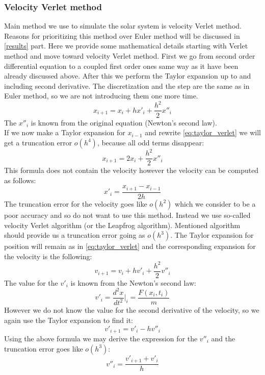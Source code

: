 \documentclass[10pt]{article}
\begin{document}
\subsubsection{Velocity Verlet method}
Main method we use to simulate the solar system is velocity Verlet method. Reasons for prioritizing this method over Euler method will be discussed in \ref{results} part. Here we provide some mathematical details starting with Verlet method and move toward velocity Verlet method. First we go from second order differential equation to a coupled first order ones same way as it have been already discussed above. After this we perform the Taylor expansion up to and including second derivative. The discretization and the step are the same as in Euler method, so we are not introducing them one more time.
\begin{equation}\label{eq:taylor_verlet}
x_{i+1}=x_i+hx'_i+\frac{h^2}{2}x''_i
\end{equation}
The $x''_i$ is known from the original equation (Newton's second law).\\
If we now make a Taylor expansion for $x_{i-1}$ and rewrite \ref{eq:taylor_verlet} we will get a truncation error $o(h^4)$, because all odd terms disappear: 
\[
x_{i+1}=2x_i+\frac{h^2}{2}x''_i
\]
This formula does not contain the velocity however the velocity can be computed as follows:
\[
x'_i=\frac{x_{i+1}-x_{i-1}}{2h}
\]
The truncation error for the velocity goes like $o(h^2)$ which we consider to be a poor accuracy and so do not want to use this method. Instead we use so-called velocity Verlet algorithm (or the Leapfrog algorithm). Mentioned algorithm should provide us a truncation error going as $o(h^3)$. The Taylor expansion for position will remain as in \ref{eq:taylor_verlet} and the corresponding expansion for the velocity is the following:
\begin{equation}
v_{i+1}=v_i+hv'_i+\frac{h^2}{2}v''_i
\end{equation}
The value for the $v'_i$ is known from the Newton's second law:
$$v'_i={\frac{d^2x}{dt^2}\Bigg|_i}=\frac{F(x_i,t_i)}{m}$$
However we do not know the value for the second derivative of the velocity, so we again use the Taylor expansion to find it:
\begin{equation}
v'_{i+1}=v'_i-hv''_i
\end{equation}
Using the above formula we may derive the expression for the $v''_i$ and the truncation error goes like $o(h^3)$:
\begin{equation}
v''_i=\frac{v'_{i+1}+v'_i}{h}
\end{equation}
\end{document}
